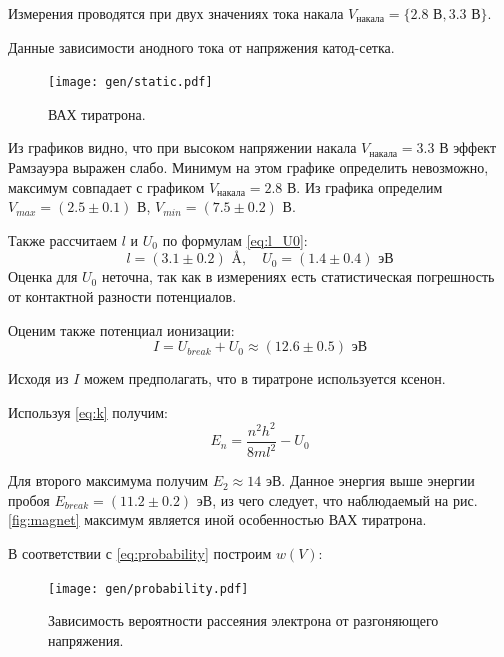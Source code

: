 \documentclass[12pt,a4paper]{article}
\begin{document}
	Измерения проводятся при двух значениях тока накала $V_{\text{накала}} = \{2.8 \text{ В}, 3.3 \text{ В}\}$.
	
	\begin{table}[H]
		\footnotesize
		
		\caption{Данные зависимости анодного тока от напряжения катод-сетка.}
		\label{tab:data}
	\end{table}
	
	\begin{figure}[H]
		\centering
		\texttt{[image: gen/static.pdf]}
		\caption{ВАХ тиратрона.}
		\label{fig:static}
	\end{figure}
	
	Из графиков видно, что при высоком напряжении накала $V_{\text{накала}} = 3.3$ В эффект Рамзауэра выражен слабо. Минимум на этом графике определить невозможно, максимум совпадает с графиком $V_{\text{накала}} = 2.8$ В.
	Из графика определим $V_{max} = (2.5 \pm 0.1)$ В, $V_{min} = (7.5 \pm 0.2)$ В.
	
	Также рассчитаем $l$ и $U_0$ по формулам \eqref{eq:l_U0}:
	\begin{equation}
		l = (3.1 \pm 0.2) \text{ \AA}, \quad U_0 = (1.4 \pm 0.4) \text{ эВ}
	\end{equation}
	Оценка для $U_0$ неточна, так как в измерениях есть статистическая погрешность от контактной разности потенциалов.
	
	Оценим также потенциал ионизации:
	\begin{equation}
		I = U_{break} + U_0 \approx (12.6 \pm 0.5) \text{ эВ}
	\end{equation}
	
	Исходя из $I$ можем предполагать, что в тиратроне используется ксенон.
	
	Используя \eqref{eq:k} получим:
	\begin{equation}
		E_n = \frac{n^2 h^2}{8 m l^2} - U_0
	\end{equation}
	
	Для второго максимума получим $E_2 \approx 14$ эВ. Данное энергия выше энергии пробоя $E_{break} = (11.2 \pm 0.2)$ эВ, из чего следует, что наблюдаемый на рис. \ref{fig:magnet} максимум является иной особенностью ВАХ тиратрона.

	В соответствии с \eqref{eq:probability} построим $w(V)$:
	
	\begin{figure}[H]
		\centering
		\texttt{[image: gen/probability.pdf]}
		\caption{Зависимость вероятности рассеяния электрона от разгоняющего напряжения.}
		\label{fig:probability}
	\end{figure}
	
\end{document}
